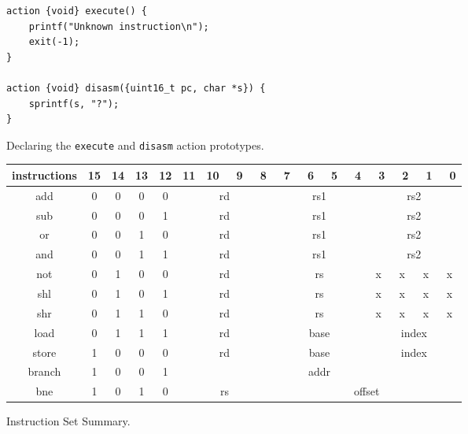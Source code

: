 \begin{figure}[ht]
\begin{verbatim}
action {void} execute() {
    printf("Unknown instruction\n");
    exit(-1);
}

action {void} disasm({uint16_t pc, char *s}) {
    sprintf(s, "?");
}
\end{verbatim}
\caption{Declaring the \texttt{execute} and \texttt{disasm} action prototypes.}
\label{action}
\end{figure}

\begin{figure}[h!tb]
	\begin{center}
		\begin{tabular}{|c|c|c|c|c|c|c|c|c|c|c|c|c|c|c|c|c|}
			\hline
			instructions &  15  &  14  &  13  &  12  &  11  &  10  &  ~9  & ~8  &  ~7  &  ~6  &  ~5  &  ~4  &  ~3  &  ~2  &  ~1  &  ~0 \\
			\hline
			add    &   0  &   0  &   0  &   0  & \multicolumn{4}{|c|}{rd} & \multicolumn{4}{|c|}{rs1} & \multicolumn{4}{|c|}{rs2}\\
			\hline
			sub    &   0  &   0  &   0  &   1  & \multicolumn{4}{|c|}{rd} & \multicolumn{4}{|c|}{rs1} & \multicolumn{4}{|c|}{rs2}\\
			\hline
			or     &   0  &   0  &   1  &   0  & \multicolumn{4}{|c|}{rd} & \multicolumn{4}{|c|}{rs1} & \multicolumn{4}{|c|}{rs2}\\
			\hline
			and    &   0  &   0  &   1  &   1  & \multicolumn{4}{|c|}{rd} & \multicolumn{4}{|c|}{rs1} & \multicolumn{4}{|c|}{rs2}\\
			\hline
			not    &   0  &   1  &   0  &   0  & \multicolumn{4}{|c|}{rd}  & \multicolumn{4}{|c|}{rs} &   x  &   x  &   x  &   x \\
			\hline
			shl    &   0  &   1  &   0  &   1  & \multicolumn{4}{|c|}{rd}  & \multicolumn{4}{|c|}{rs} &   x  &   x  &   x  &   x \\
			\hline
			shr    &   0  &   1  &   1  &   0  & \multicolumn{4}{|c|}{rd}  & \multicolumn{4}{|c|}{rs} &   x  &   x  &   x  &   x \\
			\hline
			load   &   0  &   1  &   1  &   1  & \multicolumn{4}{|c|}{rd}  & \multicolumn{4}{|c|}{base} & \multicolumn{4}{|c|}{index}\\
			\hline
			store  &   1  &   0  &   0  &   0  & \multicolumn{4}{|c|}{rd}  & \multicolumn{4}{|c|}{base} & \multicolumn{4}{|c|}{index}\\
			\hline
			branch &   1  &   0  &   0  &   1  & \multicolumn{12}{|c|}{addr}\\
			\hline
			bne    &   1  &   0  &   1  &   0  & \multicolumn{4}{|c|}{rs} & \multicolumn{8}{|c|}{offset}\\
			\hline
		\end{tabular}
		\caption{Instruction Set Summary.}
		\label{instruction_set_summary}
	\end{center}
\end{figure}

